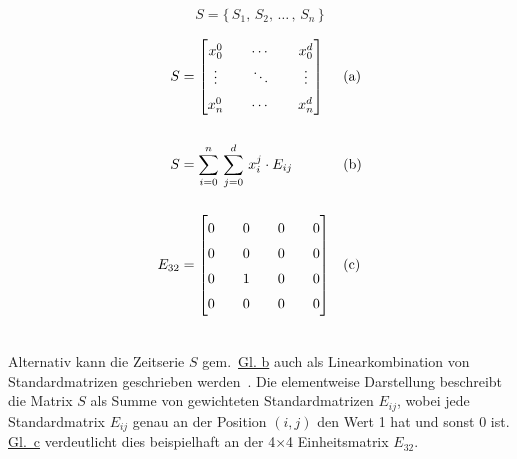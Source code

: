 \begin{equation}
    S=\{\,S_1,\,S_2,\,\dots\,,\,S_n\,\}\label{eq:timeseries_set}
\end{equation}

\begin{equation}
    \setcounter{equation}{1}
        \begin{subequations}
        \setlength{\arraycolsep}{1em}
        \renewcommand{\arraystretch}{1.5}
        \begin{aligned}
            S &=
            \begin{bmatrix} 
                x_{0}^{0} & \cdots & x_{0}^{d} \\
                \vdots & \ddots & \vdots \\
                x_{n}^{0} & \cdots & x_{n}^{d} 
            \end{bmatrix} 
            && \text{(a)} \\[1.5em]
            S &= \sum_{i=0}^{n}\,\sum_{j=0}^{d}\,x_{i}^{j} \cdot E_{ij}
            && \text{(b)}\\[1.5em]
            E_{32} &=
            \begin{bmatrix}
                0 & 0 & 0 & 0 \\
                0 & 0 & 0 & 0 \\
                0 & 1 & 0 & 0 \\
                0 & 0 & 0 & 0 \\
            \end{bmatrix}
            && \text{(c)} \\[1.5em]
        \end{aligned}
    \end{subequations}
\label{eq:timeseries_matrix_sum}
\end{equation}

Alternativ kann die Zeitserie $S$ gem.~\hyperref[eq:timeseries_matrix_sum]{Gl. b} auch als Linearkombination
von Standardmatrizen geschrieben werden~\cite[S.~8]{Voigt2012}. Die elementweise Darstellung beschreibt die Matrix $S$ als Summe von
gewichteten Standardmatrizen $E_{ij}$, wobei jede Standardmatrix $E_{ij}$ genau an der Position $(i,j)$ den Wert 1 hat und sonst 0 ist.
\hyperref[eq:timeseries_matrix_sum]{Gl.~c} verdeutlicht dies beispielhaft an der 4$\times$4 Einheitsmatrix
$E_{32}$.

